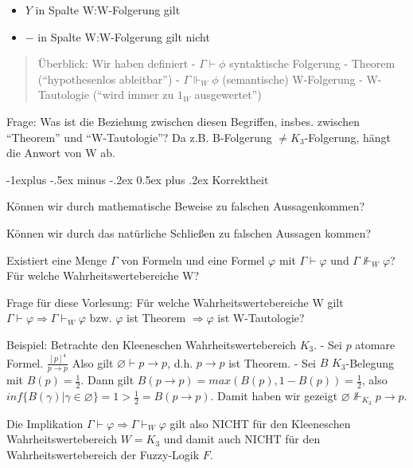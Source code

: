 \documentclass[a4paper]{article}
\makeatletter
\renewcommand{\subsection}{\@startsection{subsection}{2}{0mm}%
                {-1explus -.5ex minus -.2ex}%
                {0.5ex plus .2ex}%
                {\normalfont\normalsize\bfseries}}
\makeatother
\begin{document}
\begin{multicols}{3}
  \begin{itemize}
    \itemsep1pt\parskip0pt
    \item
          $Y$ in Spalte W:W-Folgerung gilt
    \item
          $-$ in Spalte W:W-Folgerung gilt nicht
  \end{itemize}

  \begin{quote}
    Überblick: Wir haben definiert - $\Gamma\vdash\phi$ syntaktische
    Folgerung - Theorem (``hypothesenlos ableitbar'') -
    $\Gamma\Vdash_W \phi$ (semantische) W-Folgerung - W-Tautologie (``wird
    immer zu $1_W$ ausgewertet'')
  \end{quote}

  Frage: Was ist die Beziehung zwischen diesen Begriffen, insbes. zwischen
  ``Theorem'' und ``W-Tautologie''? Da z.B. B-Folgerung
  $\not =K_3$-Folgerung, hängt die Anwort von W ab.

  \subsection{Korrektheit}\label{korrektheit}

  Können wir durch mathematische Beweise zu falschen Aussagenkommen?

  Können wir durch das natürliche Schließen zu falschen Aussagen kommen?

  Existiert eine Menge $\Gamma$ von Formeln und eine Formel $\varphi$ mit
  $\Gamma\vdash\varphi$ und $\Gamma\not\Vdash_W \varphi$? Für welche
  Wahrheitswertebereiche W?

  Frage für diese Vorlesung: Für welche Wahrheitswertebereiche W gilt
  $\Gamma\vdash\varphi\Rightarrow\Gamma\vdash_W \varphi$ bzw. $\varphi$
  ist Theorem $\Rightarrow\varphi$ ist W-Tautologie?

  Beispiel: Betrachte den Kleeneschen Wahrheitswertebereich $K_3$. - Sei
  $p$ atomare Formel. $\frac{[p]^4}{p\rightarrow p}$ Also gilt
  $\varnothing\vdash p\rightarrow p$, d.h. $p\rightarrow p$ ist Theorem. -
  Sei $B$ $K_3$-Belegung mit $B(p)=\frac{1}{2}$. Dann gilt
  $B(p\rightarrow p) = max(B(p), 1-B(p)) =\frac{1}{2}$, also
  $inf\{B(\gamma)|\gamma\in\varnothing\}= 1 >\frac{1}{2} = B(p\rightarrow p)$.
  Damit haben wir gezeigt $\varnothing\not\Vdash_{K_3} p\rightarrow p$.

  Die Implikation $\Gamma\vdash\varphi\Rightarrow\Gamma\vdash_W \varphi$
  gilt also NICHT für den Kleeneschen Wahrheitswertebereich $W=K_3$ und
  damit auch NICHT für den Wahrheitswertebereich der Fuzzy-Logik $F$.


\end{multicols}
\end{document}
